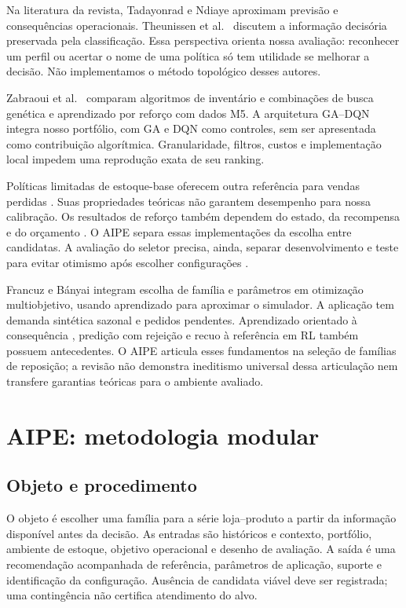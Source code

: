 \documentclass[preprint,12pt]{elsarticle}
\begin{document}
Na literatura da revista, Tadayonrad e Ndiaye \cite{sca_f81ad2b3e023} aproximam previsão e consequências operacionais. Theunissen et al.\ \cite{sca_c5c06dcbc9e5} discutem a informação decisória preservada pela classificação. Essa perspectiva orienta nossa avaliação: reconhecer um perfil ou acertar o nome de uma política só tem utilidade se melhorar a decisão. Não implementamos o método topológico desses autores.

Zabraoui et al.\ \cite{sca_27e994c54848} comparam algoritmos de inventário e combinações de busca genética e aprendizado por reforço com dados M5. A arquitetura GA--DQN integra nosso portfólio, com GA e DQN como controles, sem ser apresentada como contribuição algorítmica. Granularidade, filtros, custos e implementação local impedem uma reprodução exata de seu ranking.

Políticas limitadas de estoque-base oferecem outra referência para vendas perdidas \cite{Xin2021CappedBaseStock}. Suas propriedades teóricas não garantem desempenho para nossa calibração. Os resultados de reforço também dependem do estado, da recompensa e do orçamento \cite{Boute2022DRLInventoryRoadmap}. O AIPE separa essas implementações da escolha entre candidatas. A avaliação do seletor precisa, ainda, separar desenvolvimento e teste para evitar otimismo após escolher configurações \cite{CawleyTalbot2010}.

Francuz e Bányai \cite{FrancuzBanyai2026Selection} integram escolha de família e parâmetros em otimização multiobjetivo, usando aprendizado para aproximar o simulador. A aplicação tem demanda sintética sazonal e pedidos pendentes. Aprendizado orientado à consequência \cite{ElmachtoubGrigas2022SPO}, predição com rejeição \cite{GeifmanElYaniv2019SelectiveNet} e recuo à referência em RL \cite{Laroche2019SPIBB} também possuem antecedentes. O AIPE articula esses fundamentos na seleção de famílias de reposição; a revisão não demonstra ineditismo universal dessa articulação nem transfere garantias teóricas para o ambiente avaliado.

\section{AIPE: metodologia modular}
\subsection{Objeto e procedimento}
O objeto é escolher uma família para a série loja--produto a partir da informação disponível antes da decisão. As entradas são históricos e contexto, portfólio, ambiente de estoque, objetivo operacional e desenho de avaliação. A saída é uma recomendação acompanhada de referência, parâmetros de aplicação, suporte e identificação da configuração. Ausência de candidata viável deve ser registrada; uma contingência não certifica atendimento do alvo.
\end{document}
